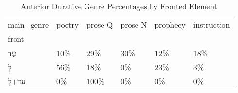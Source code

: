\begin{table}[htbp!]
\centering
\caption{Anterior Durative Genre Percentages by Fronted Element}
\label{table:antdur_gen_pc}
\begin{tabular}{llllll}
\toprule
main\_genre & poetry & prose-Q & prose-N & prophecy & instruction \\
front  &        &         &         &          &             \\
\midrule
עַד    &    10\% &     29\% &     30\% &      12\% &         18\% \\
לְ     &    56\% &     18\% &      0\% &      23\% &          3\% \\
עַד+לְ &     0\% &    100\% &      0\% &       0\% &          0\% \\
\bottomrule
\end{tabular}
\end{table}
